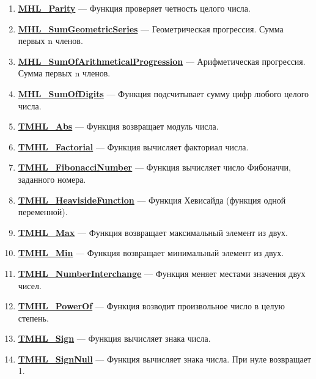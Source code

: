 \documentclass[a4paper,12pt]{article}
\begin{document}
\begin{enumerate}
\item \textbf{\hyperref[MHL_Parity]{MHL\_Parity}} --- Функция проверяет четность целого числа.

\item \textbf{\hyperref[MHL_SumGeometricSeries]{MHL\_SumGeometricSeries}} --- Геометрическая прогрессия. Сумма первых n членов.

\item \textbf{\hyperref[MHL_SumOfArithmeticalProgression]{MHL\_SumOfArithmeticalProgression}} --- Арифметическая прогрессия. Сумма первых n членов.

\item \textbf{\hyperref[MHL_SumOfDigits]{MHL\_SumOfDigits}} --- Функция подсчитывает сумму цифр любого целого числа.

\item \textbf{\hyperref[TMHL_Abs]{TMHL\_Abs}} --- Функция возвращает модуль числа.

\item \textbf{\hyperref[TMHL_Factorial]{TMHL\_Factorial}} --- Функция вычисляет факториал числа.

\item \textbf{\hyperref[TMHL_FibonacciNumber]{TMHL\_FibonacciNumber}} --- Функция вычисляет число Фибоначчи, заданного номера.

\item \textbf{\hyperref[TMHL_HeavisideFunction]{TMHL\_HeavisideFunction}} --- Функция Хевисайда (функция одной переменной).

\item \textbf{\hyperref[TMHL_Max]{TMHL\_Max}} --- Функция возвращает максимальный элемент из двух.

\item \textbf{\hyperref[TMHL_Min]{TMHL\_Min}} --- Функция возвращает минимальный элемент из двух.

\item \textbf{\hyperref[TMHL_NumberInterchange]{TMHL\_NumberInterchange}} --- Функция меняет местами значения двух чисел.

\item \textbf{\hyperref[TMHL_PowerOf]{TMHL\_PowerOf}} --- Функция возводит произвольное число в целую степень.

\item \textbf{\hyperref[TMHL_Sign]{TMHL\_Sign}} --- Функция вычисляет знака числа.

\item \textbf{\hyperref[TMHL_SignNull]{TMHL\_SignNull}} --- Функция вычисляет знака числа. При нуле возвращает 1.

\end{enumerate}
\end{document}
